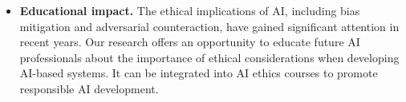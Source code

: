 \begin{itemize}
	\item \textbf{Educational impact.} The ethical implications of AI, including bias mitigation and adversarial counteraction, have gained significant attention in recent years. Our research offers an opportunity to educate future AI professionals about the importance of ethical considerations when developing AI-based systems. It can be integrated into AI ethics courses to promote responsible AI development. %
	
	
	

\end{itemize}
\vspace{-.4cm}



